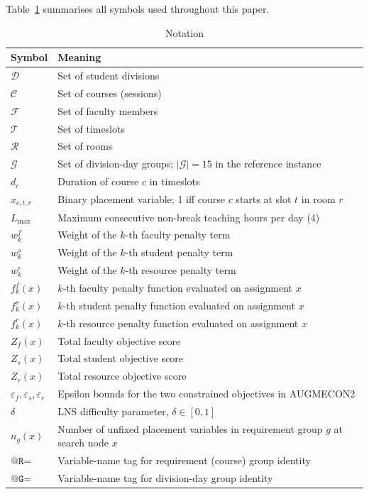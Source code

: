 \documentclass[conference]{IEEEtran}
\begin{document}
Table~\ref{tab:notation} summarises all symbols used throughout this paper.

\begin{table}[htbp]
\centering
\caption{Notation}
\label{tab:notation}
\renewcommand{\arraystretch}{1.15}
\begin{tabular}{>{\ttfamily}lp{5.5cm}}
\toprule
\textbf{Symbol} & \textbf{Meaning} \\
\midrule
$\mathcal{D}$ & Set of student divisions \\
$\mathcal{C}$ & Set of courses (sessions) \\
$\mathcal{F}$ & Set of faculty members \\
$\mathcal{T}$ & Set of timeslots \\
$\mathcal{R}$ & Set of rooms \\
$\mathcal{G}$ & Set of division-day groups; $|\mathcal{G}|=15$ in the reference instance \\
$d_c$         & Duration of course $c$ in timeslots \\
$x_{c,t,r}$  & Binary placement variable; 1 iff course $c$ starts at slot $t$ in room $r$ \\
$L_{\max}$   & Maximum consecutive non-break teaching hours per day (4) \\
$w^f_k$       & Weight of the $k$-th faculty penalty term \\
$w^s_k$       & Weight of the $k$-th student penalty term \\
$w^r_k$       & Weight of the $k$-th resource penalty term \\
$f^f_k(x)$    & $k$-th faculty penalty function evaluated on assignment $x$ \\
$f^s_k(x)$    & $k$-th student penalty function evaluated on assignment $x$ \\
$f^r_k(x)$    & $k$-th resource penalty function evaluated on assignment $x$ \\
$Z_f(x)$      & Total faculty objective score \\
$Z_s(x)$      & Total student objective score \\
$Z_r(x)$      & Total resource objective score \\
$\varepsilon_f, \varepsilon_s, \varepsilon_r$ & Epsilon bounds for the two constrained objectives in AUGMECON2 \\
$\delta$      & LNS difficulty parameter, $\delta \in [0,1]$ \\
$n_g(x)$      & Number of unfixed placement variables in requirement group $g$ at search node $x$ \\
$\texttt{@R=}$& Variable-name tag for requirement (course) group identity \\
$\texttt{@G=}$& Variable-name tag for division-day group identity \\
\bottomrule
\end{tabular}
\end{table}
\end{document}
